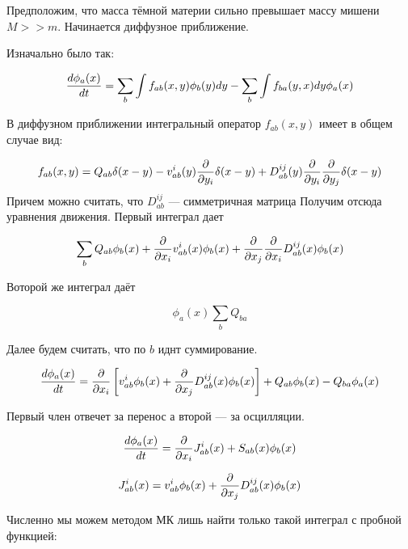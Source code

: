 Предположим, что масса тёмной материи сильно превышает массу мишени $M >> m$. Начинается диффузное приближение.

Изначально было так:

\begin{equation*}
	\frac{d \phi_a(x)}{d t} = \sum_b\int{f_{ab}(x,y) \phi_b(y) dy} - \sum_b \int{f_{ba}(y,x)  dy} \phi_a(x)
\end{equation*}

В диффузном приближении интегральный оператор $f_{ab}(x,y)$ имеет в общем случае вид:

\begin{equation*}
	f_{ab}(x,y) = Q_{ab} \delta(x-y) -  v^i_{ab}(y)\frac{\partial }{\partial y_i} \delta(x-y) +  D^{ij}_{ab}(y) \frac{\partial }{\partial y_i} \frac{\partial }{\partial y_j} \delta(x-y)
\end{equation*}
Причем можно считать, что $D^{ij}_{ab}$ --- симметричная матрица
Получим отсюда уравнения движения.
Первый интеграл дает


\begin{equation*}
	\sum_b{Q_{ab} \phi_b(x) + \frac{\partial }{\partial x_i} v^i_{ab}(x) \phi_b(x)  +  \frac{\partial }{\partial x_j} \frac{\partial }{\partial x_i} D^{ij}_{ab}(x)  \phi_b(x)}
\end{equation*}

Воторой же интеграл даёт 

\begin{equation*}
	\phi_a(x) \sum_b{Q_{ba}}
\end{equation*}

Далее будем считать, что по $b$ иднт суммирование.

\begin{equation*}
	\frac{d \phi_a(x)}{d t} = \frac{\partial }{\partial x_i}\left[ v^i_{ab} \phi_b(x)  +\frac{\partial }{\partial x_j} D^{ij}_{ab}(x)  \phi_b(x) \right] + Q_{ab}  \phi_b(x) -Q_{ba} \phi_a(x) 
\end{equation*}

Первый член отвечет за перенос а второй --- за осцилляции.

\begin{equation*}
	\frac{d \phi_a(x)}{d t} = \frac{\partial }{\partial x_i}J^i_{ab}(x) + S_{ab}(x)\phi_b(x)
\end{equation*}

\begin{equation*}
	J^i_{ab}(x) = v^i_{ab} \phi_b(x)  + \frac{\partial }{\partial x_j} D^{ij}_{ab}(x)  \phi_b(x)
\end{equation*}

Численно мы можем методом МК лишь найти только такой интеграл с пробной функцией:

